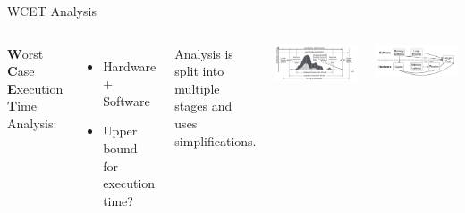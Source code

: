 \documentclass{beamer}
\begin{document}
\begin{frame}{WCET Analysis}
    \begin{columns}
        

    \textbf{W}orst \textbf{C}ase \textbf{E}xecution \textbf{T}ime Analysis:
    \begin{itemize}
        \item Hardware + Software
        \item Upper bound for execution time?
    \end{itemize}


    \begin{block}{}
        Analysis is split into multiple stages and uses simplifications.
    \end{block}


    \includegraphics[width=1\textwidth]{pic/timing-distribution.png}

    \includegraphics[width=1\textwidth]{pic/wcet-deps.png}

    \end{columns}
\end{frame}

\end{document}
